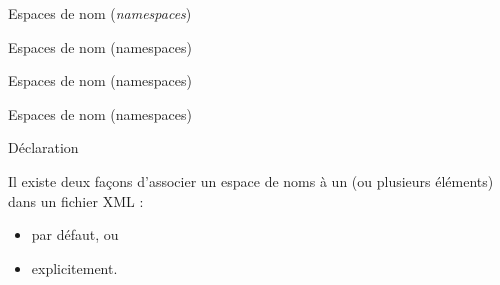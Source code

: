 



 
\begin{frame}{Espaces de nom (\textit{namespaces})}

\begin{center}
\end{center}

\end{frame}


\begin{frame}{Espaces de nom (namespaces)}

\begin{center}
\end{center}

\end{frame}


\begin{frame}{Espaces de nom (namespaces)}

\begin{center}
\end{center}

\end{frame}


\begin{frame}{Espaces de nom (namespaces)}

\begin{center}
\end{center}


\end{frame}



\begin{frame}{Déclaration}

Il existe deux façons d'associer un espace de noms à un (ou plusieurs éléments) dans un fichier XML :
\begin{itemize}
\item par défaut, ou
\item explicitement.
\end{itemize}

\end{frame}

